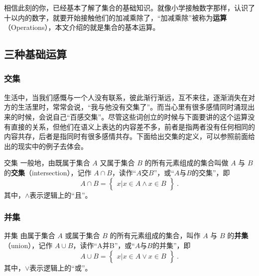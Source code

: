 
\begin{issues}
\issueDraft
\end{issues}
相信此刻的你，已经基本了解了集合的基础知识。就像小学接触数字那样，认识了十以内的数字，就要开始接触他们的加减乘除了，“加减乘除”被称为\textbf{运算}（Operations），本文介绍的就是集合的基本运算。

\subsection{三种基础运算}

\subsubsection{交集}

生活中，当我们感慨与一个人没有联系，彼此渐行渐远，互不来往，逐渐消失在对方的生活里时，常常会说，“我与他没有交集了”。而当心里有很多感情同时涌现出来的时候，会说自己“百感交集”。尽管这些词创立的时候与下面要讲的这个运算没有直接的关系，但他们在语义上表达的内容差不多，前者是指两者没有任何相同的内容共存，后者是指同时有很多感情共存。下面给出交集的定义，可以参照前面给出的现实中的例子去体会。

\begin{definition}{交集}
一般地，由既属于集合 $A$ 又属于集合 $B$ 的所有元素组成的集合叫做 $A$ 与 $B$ 的\textbf{交集}（intersection），记作 $A \cap B$，读作“$A$交$B$”，或“$A$与$B$的交集”，即
\begin{equation}
A\cap B = \begin{Bmatrix} x|x\in A\land x\in B \end{Bmatrix}~.
\end{equation}
其中，$\land$表示逻辑上的“且”。
\end{definition}


\subsubsection{并集}
\begin{definition}{并集}
由属于集合 $A$ 或属于集合 $B$ 的所有元素组成的集合，叫作 $A$ 与 $B$ 的\textbf{并集}（union），记作 $A\cup B$，读作“A并B”，或“$A$与$B$的并集”，即
\begin{equation}
A\cup B = \begin{Bmatrix}x|x\in A \lor x\in B\end{Bmatrix}~.
\end{equation}
其中，$\lor$表示逻辑上的“或”。
\end{definition}


